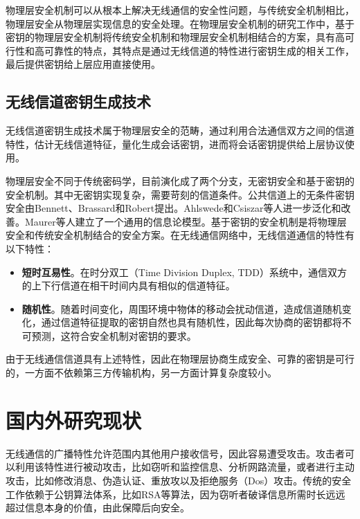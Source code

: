 \documentclass[master]{seuthesis} %
\begin{document}
\begin{Main}
物理层安全机制可以从根本上解决无线通信的安全性问题，与传统安全机制相比，物理层安全从物理层实现信息的安全处理。在物理层安全机制的研究工作中，基于密钥的物理层安全机制将传统安全机制和物理层安全机制相结合的方案，具有高可行性和高可靠性的特点，其特点是通过无线信道的特性进行密钥生成的相关工作，最后提供密钥给上层应用直接使用。

\subsection{无线信道密钥生成技术}

无线信道密钥生成技术属于物理层安全的范畴，通过利用合法通信双方之间的信道特性，估计无线信道特征，量化生成会话密钥，进而将会话密钥提供给上层协议使用。

物理层安全不同于传统密码学，目前演化成了两个分支，无密钥安全和基于密钥的安全机制。其中无密钥实现复杂，需要苛刻的信道条件。公共信道上的无条件密钥安全由Bennett、Brassard和Robert提出\cite{bennett1985reduce}\cite{bennett1988privacy}。Ahlswede和Csiszar等人进一步泛化和改善\cite{ahlswede1993common}。Maurer等人建立了一个通用的信息论模型\cite{maurer1993secret}。基于密钥的安全机制是将物理层安全和传统安全机制结合的安全方案。在无线通信网络中，无线信道通信的特性有以下特性：

\begin{itemize}
    \item \textbf{短时互易性}。在时分双工（Time Division Duplex, TDD）系统中，通信双方的上下行信道在相干时间内具有相似的信道特征。
    \item \textbf{随机性}。随着时间变化，周围环境中物体的移动会扰动信道，造成信道随机变化，通过信道特征提取的密钥自然也具有随机性，因此每次协商的密钥都将不可预测，这符合安全机制对密钥的要求。
\end{itemize}

由于无线通信信道具有上述特性，因此在物理层协商生成安全、可靠的密钥是可行的，一方面不依赖第三方传输机构，另一方面计算复杂度较小。

\section{国内外研究现状}

无线通信的广播特性允许范围内其他用户接收信号，因此容易遭受攻击。攻击者可以利用该特性进行被动攻击，比如窃听和监控信息、分析网路流量，或者进行主动攻击，比如修改消息、伪造认证、重放攻以及拒绝服务（Dos）攻击\cite{Zhang2016Key}。传统的安全工作依赖于公钥算法体系，比如RSA等算法，因为窃听者破译信息所需时长远远超过信息本身的价值，由此保障后向安全。


\end{Main}
\end{document}
